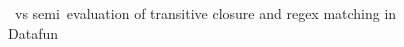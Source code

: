 \begin{figure}

  \caption{\Naive\ vs semi\naive\ evaluation of transitive closure and regex matching in Datafun}
  \label{figure-seminaive-vs-naive-graph}
\end{figure}
